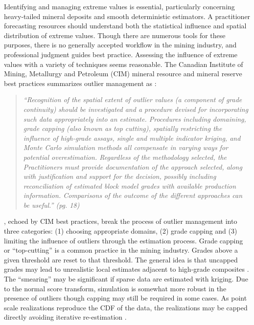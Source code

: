 Identifying and managing extreme values is essential, particularly concerning heavy-tailed mineral deposits and smooth deterministic estimators. A practitioner forecasting resources should understand both the statistical influence and spatial distribution of extreme values. Though there are numerous tools for these purposes, there is no generally accepted workflow in the mining industry, and professional judgment guides best practice. Assessing the influence of extreme values with a variety of techniques seems reasonable. The Canadian Institute of Mining, Metallurgy and Petroleum (CIM) mineral resource and mineral reserve best practices summarizes outlier management as \citep{cim2019}:

\blockquote{\textit{``Recognition of the spatial extent of outlier values (a component of grade continuity) should be investigated and a procedure devised for incorporating such data appropriately into an estimate. Procedures including domaining, grade capping (also known as top cutting), spatially restricting the influence of high-grade assays, single and multiple indicator kriging, and Monte Carlo simulation methods all compensate in varying ways for potential overestimation. Regardless of the methodology selected, the Practitioners must provide documentation of the approach selected, along with justification and support for the decision, possibly including reconciliation of estimated block model grades with available production information. Comparisons of the outcome of the different approaches can be useful.'' (pg. 18)}}

\cite{leuangthong2015dealing}, echoed by CIM best practices, break the process of outlier management into three categories: (1) choosing appropriate domains, (2) grade capping and (3) limiting the influence of outliers through the estimation process. Grade capping or ``top-cutting'' is a common practice in the mining industry. Grades above a given threshold are reset to that threshold. The general idea is that uncapped grades may lead to unrealistic local estimates adjacent to high-grade composites \citep{nowak2013suggestions}. The ``smearing'' may be significant if sparse data are estimated with kriging. Due to the normal score transform, simulation is somewhat more robust in the presence of outliers though capping may still be required in some cases. As point scale realizations reproduce the \gls{CDF} of the data, the realizations may be capped directly avoiding iterative re-estimation \citep{harding2023probabilistic}.

\FloatBarrier
